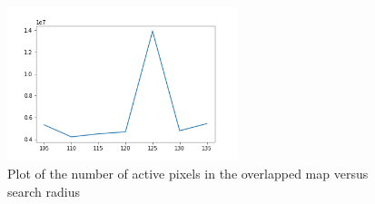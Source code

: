 \begin{figure}[h!]
\centering
\includegraphics[width=0.6\textwidth]{Images/Map1/similarity_versus_radius_map_1.png}
\caption{Plot of the number of active pixels in the overlapped map versus search radius}
\label{search1}
\end{figure}

